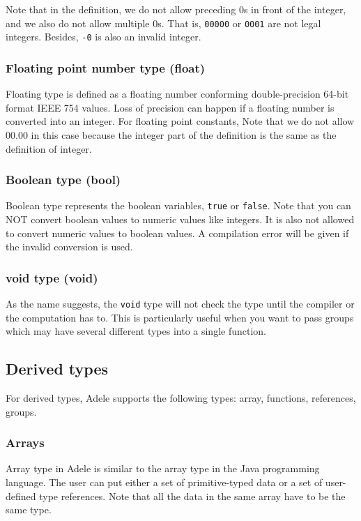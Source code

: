 \documentclass[11pt,letterpaper]{article}
\begin{document}
Note that in the definition, we do not allow preceding 0s in front of the integer, and we also do not allow multiple 0s. That is, \texttt{00000} or \texttt{0001} are not legal integers. Besides, \texttt{-0} is also an invalid integer.

 \subsubsection*{Floating point number type (float)} 
Floating type is defined as a floating number conforming double-precision 64-bit format IEEE 754 values. Loss of precision can happen if a floating number is converted into an integer. For floating point constants, Note that we do not allow 00.00 in this case because the integer part of the definition is the same as the definition of integer.

\subsubsection*{Boolean type (bool)} 
Boolean type represents the boolean variables, \texttt{true} or \texttt{false}. Note that you can NOT convert boolean values to numeric values like integers. It is also not allowed to convert numeric values to boolean values. A compilation error will be given if the invalid conversion is used.

\subsubsection*{void type (void)} 
As the name suggests, the \texttt{void} type will not check the type until the compiler or the computation has to. This is particularly useful when you want to pass groups which may have several different types into a single function.

\subsection{Derived types}
For derived types, Adele supports the following types: array, functions, references, groups.

\subsubsection*{Arrays}
Array type in Adele is similar to the array type in the Java programming language. The user can put either a set of primitive-typed data or a set of user-defined type references. Note that all the data in the same array have to be the same type.
\end{document}
